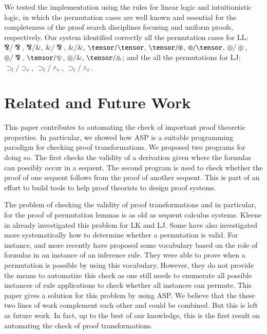 \documentclass{new_tlp}
\begin{document}
We tested the implementation using the rules for linear logic and
intuitionistic logic, in which
the permutation cases are well known and essential for the completeness of
the proof search disciplines focusing and uniform proofs, respectively. 
Our system identified correctly all the permutation cases for LL:
$\bindnasrepma / \bindnasrepma$, $\bindnasrepma / \binampersand$,
$\binampersand
/ \bindnasrepma$, $\binampersand / \binampersand$,
$\tensor / \tensor$, $\tensor / \oplus$, $\oplus / \tensor$, $\oplus /
\oplus$,
$\oplus / \bindnasrepma$, $\tensor / \bindnasrepma$, $\oplus /
\binampersand$, $\tensor
/ \binampersand$;
and the all the permutations for LJ:
$\supset_l / \supset_r$, $\supset_l / \wedge_r$,
$\supset_l / \wedge_l$.

\vspace{-2mm}

\section{Related and Future Work}
\label{sec:conc}

This paper contributes to automating the check of important
proof theoretic properties. In particular, we showed how ASP is a suitable programming
paradigm for checking proof transformations. We proposed two programs for doing so. 
The first checks the validity of a derivation given where the formulas can
possibly occur in a sequent. The second program is used to check 
whether the proof of one sequent follows from the proof of another sequent.
This is part of an effort to build tools to help proof theorists to design proof 
systems. 

The problem of checking the validity of proof transformations and in particular, 
for the proof of permutation lemmas is as old as sequent calculus systems. Kleene
in \cite{kleene52ams} already investigated this problem for LK and LJ.
Some have also investigated more systematically how to determine whether a permutation 
is valid. For instance, \cite{galmiche94tcs} and more recently \cite{lutovac13comsis} have 
proposed some vocabulary based on the role of formulas in an instance of an inference rule. 
They were able to prove when a permutation is possible by using this vocabulary.
However, they do not provide the means to automatize this check as one still needs
to enumerate all possible instances of rule applications to check whether all instances
can permute. This paper gives a solution for this problem by using ASP. We believe that
the these two lines of work complement each other and could be combined. But this is
left as future work. In fact, up to the best of our knowledge, this is the first 
result on automating the check of proof transformations.
\end{document}
